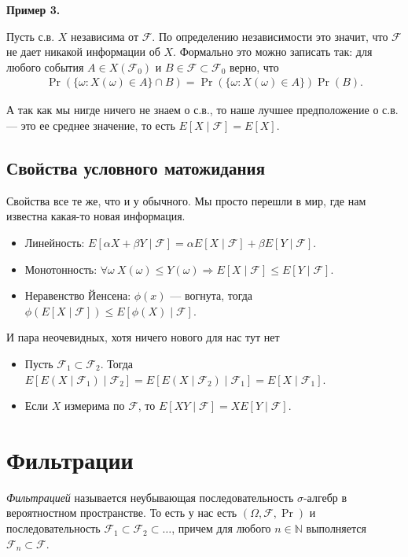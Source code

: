 \documentclass[12pt]{article}
\newcommand\N{\mathbb{N}}
\newcommand\F{\mathcal{F}}
\begin{document}
\textbf{Пример 3.}

Пусть с.в. $X$ независима от $\F$. По определению независимости это значит, что $\F$ не дает никакой информации об $X$. Формально это можно записать так: для любого события $A \in X(\F_0)$ и $B \in \F \subset \F_0$ верно, что
\begin{align*}
  \Pr(\{\omega: X(\omega) \in A\} \cap B) = \Pr(\{\omega: X(\omega) \in A\}) \Pr(B).
\end{align*} 

А так как мы нигде ничего не знаем о с.в., то наше лучшее предположение о с.в. --- это ее среднее значение, то есть $E[X \mid \F] = E[X]$.

\subsection{Свойства условного матожидания}

Свойства все те же, что и у обычного. Мы просто перешли в мир, где нам известна какая-то новая информация.

\begin{itemize}
  \item Линейность: $E[\alpha X + \beta Y \mid \F] = \alpha E[X \mid \F] + \beta E[Y \mid \F]$.
  \item Монотонность: $\forall \omega \ X(\omega) \le Y(\omega) \Rightarrow E[X \mid \F] \le E[Y \mid \F]$.
  \item Неравенство Йенсена: $\phi(x)$ --- вогнута, тогда $\phi(E[X \mid \F]) \le E[\phi(X) \mid \F]$.
\end{itemize}
И пара неочевидных, хотя ничего нового для нас тут нет
\begin{itemize}
  \item Пусть $\F_1 \subset \F_2$. Тогда $E[E(X \mid \F_1) \mid \F_2] = E[E(X \mid \F_2) \mid \F_1] = E[X \mid \F_1]$.
  \item Если $X$ измерима по $\F$, то $E[XY \mid \F] = XE[Y \mid \F]$.
\end{itemize}

\section{Фильтрации}

\emph{Фильтрацией} называется неубывающая последовательность $\sigma$-алгебр в вероятностном пространстве. То есть у нас есть $(\Omega, \F, \Pr)$ и последовательность $\F_1 \subset \F_2 \subset \dots$, причем для любого $n \in \N$ выполняется $\F_n \subset \F$. 
\end{document}
